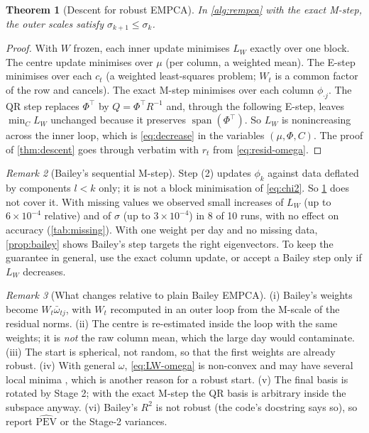 \documentclass[11pt]{article}
\newtheorem{theorem}{Theorem}[section]
\theoremstyle{definition}
\theoremstyle{remark}
\newtheorem{remark}[theorem]{Remark}
\DeclareMathOperator{\spn}{span}
\begin{document}
\begin{theorem}[Descent for robust EMPCA]\label{thm:rempca}
In \cref{alg:rempca} with the exact M-step, the outer scales satisfy $\sigma_{k+1}\le\sigma_k$.
\end{theorem}
\begin{proof}
With $W$ frozen, each inner update minimises $L_W$ exactly over one block. The centre update minimises over $\mu$
(per column, a weighted mean). The E-step minimises over each $c_t$ (a weighted least-squares problem; $W_t$ is a common
factor of the row and cancels). The exact M-step minimises over each column $\phi_{\cdot j}$. The QR step replaces
$\Phi^\top$ by $Q=\Phi^\top R^{-1}$ and, through the following E-step, leaves $\min_C L_W$ unchanged because it preserves
$\spn(\Phi^\top)$. So $L_W$ is nonincreasing across the inner loop, which is \eqref{eq:decrease} in the variables
$(\mu,\Phi,C)$. The proof of \cref{thm:descent} goes through verbatim with $r_t$ from \eqref{eq:resid-omega}.
\end{proof}

\begin{remark}[Bailey's sequential M-step]\label{rem:bailey-step}
Step (2) updates $\phi_k$ against data deflated by components $l<k$ only; it is not a block minimisation of
\eqref{eq:chi2}. So \cref{thm:rempca} does not cover it. With missing values we observed small increases of $L_W$
(up to $6\times10^{-4}$ relative) and of $\sigma$ (up to $3\times10^{-4}$) in 8 of 10 runs, with no effect on accuracy
(\cref{tab:missing}). With one weight per day and no missing data, \cref{prop:bailey} shows Bailey's step targets the
right eigenvectors. To keep the guarantee in general, use the exact column update, or accept a Bailey step only if
$L_W$ decreases.
\end{remark}

\begin{remark}[What changes relative to plain Bailey EMPCA]
(i) Bailey's weights become $W_t\bar\omega_{tj}$, with $W_t$ recomputed in an outer loop from the M-scale of the
residual norms. (ii) The centre is re-estimated inside the loop with the same weights; it is \emph{not} the raw column
mean, which the large day would contaminate. (iii) The start is spherical, not random, so that the first weights are
already robust. (iv) With general $\omega$, \eqref{eq:LW-omega} is non-convex and may have several local minima
\citep{SrebroJaakkola2003}, which is another reason for a robust start. (v) The final basis is rotated by Stage 2;
with the exact M-step the QR basis is arbitrary inside the subspace anyway. (vi) Bailey's $R^2$ is not robust (the code's
docstring says so), so report $\widehat{\mathrm{PEV}}$ or the Stage-2 variances.
\end{remark}
\end{document}
